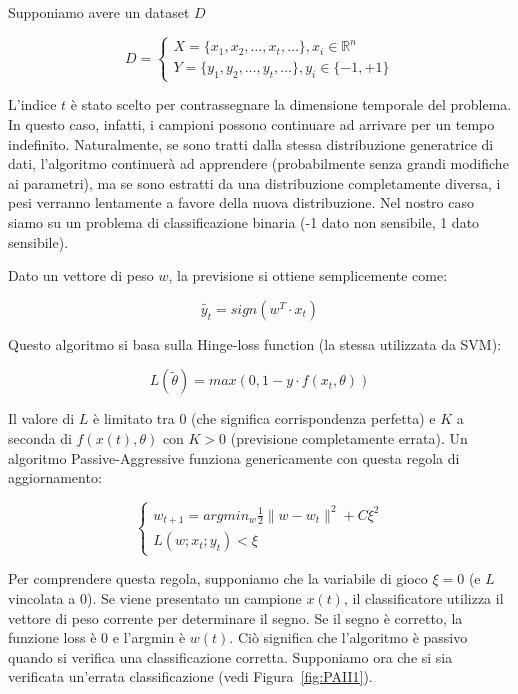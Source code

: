 Supponiamo avere un dataset $D$

$$D=\left\{
                \begin{array}{ll}
                  X=\{x_1,x_2,\dots ,x_t,\dots \}, x_i \in \mathbb{R}^n \\
                  Y=\{y_1,y_2,\dots ,y_t,\dots\}, y_i \in \{-1,+1\}
                \end{array}
              \right.$$

L'indice $t$ è stato scelto per contrassegnare la dimensione temporale del problema. In questo caso, infatti, i campioni possono continuare ad arrivare per un tempo indefinito. Naturalmente, se sono tratti dalla stessa distribuzione generatrice di dati, l'algoritmo continuerà ad apprendere (probabilmente senza grandi modifiche ai parametri), ma se sono estratti da una distribuzione completamente diversa, i pesi verranno  lentamente a favore della nuova distribuzione. Nel nostro caso siamo su un problema di classificazione binaria (-1 dato non sensibile, 1 dato sensibile).

Dato un vettore di peso $w$, la previsione si ottiene semplicemente come:

$$\tilde{y_t}=sign(w^T\cdot x_t)$$

Questo algoritmo si basa sulla Hinge-loss function (la stessa utilizzata da SVM):

$$L(\tilde{\theta})=max(0,1-y\cdot f(x_t,\theta))$$

Il valore di $L$ è limitato tra $0$ (che significa corrispondenza perfetta) e $K$ a seconda di $f(x(t), \theta)$ con $K > 0$ (previsione completamente errata). Un algoritmo Passive-Aggressive funziona genericamente con questa regola di aggiornamento:

$$\left\{
                \begin{array}{ll}
                  w_{t+1}=argmin_w\frac{1}{2}\| w-w_t\|^2 +C\xi^2\\
                  L(w;x_t;y_t) < \xi
                \end{array}
              \right.$$
              
Per comprendere questa regola, supponiamo che la variabile di gioco $\xi = 0$ (e $L$ vincolata a $0$). Se viene presentato un campione $x(t)$, il classificatore utilizza il vettore di peso corrente per determinare il segno. Se il segno è corretto, la funzione loss è $0$ e l'argmin è $w(t)$. Ciò significa che l'algoritmo è passivo quando si verifica una classificazione corretta. Supponiamo ora che si sia verificata un'errata classificazione (vedi Figura~\ref{fig:PAII1}).            
              
